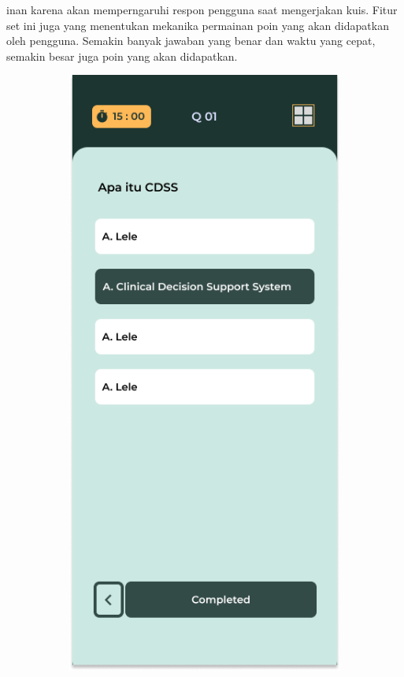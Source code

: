 inan karena akan memperngaruhi respon pengguna saat mengerjakan kuis.
Fitur set ini juga yang menentukan mekanika permainan poin yang akan didapatkan oleh pengguna. Semakin banyak jawaban yang benar dan waktu yang cepat, semakin besar juga poin yang akan didapatkan.

\begin{figure}[H]
	\centering
	\begin{subfigure}[b]{0.23\textwidth}
		\centering
	  \includegraphics[width=\linewidth]{contents/chapter-3/images/HF-kuis1-dt.png}

\end{subfigure}
\end{figure}
